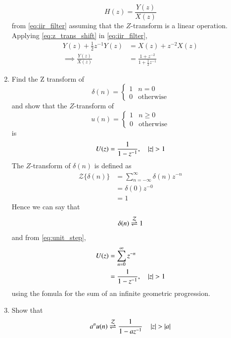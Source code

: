 \documentclass[journal,12pt,twocolumn]{IEEEtran}
\renewcommand\thesection{\arabic{section}}
\begin{document}
\begin{enumerate}[label=\thesection.\arabic*]
	\begin{equation}
		H(z) = \frac{Y(z)}{X(z)}
	\end{equation}
	from  \eqref{eq:iir_filter} assuming that the $Z$-transform is a linear operation.
	\\
	\solution  Applying \eqref{eq:z_trans_shift} in \eqref{eq:iir_filter},
	\begin{align}
		Y(z) + \frac{1}{2}z^{-1}Y(z) &= X(z)+z^{-2}X(z)
		\\
		\implies \frac{Y(z)}{X(z)} &= \frac{1 + z^{-2}}{1 + \frac{1}{2}z^{-1}}
		\label{eq:freq_resp}
	\end{align}
	\item Find the Z transform of 
	\begin{equation}
		\delta(n)
		=
		\begin{cases}
			1 & n = 0
			\\
			0 & \text{otherwise}
		\end{cases}
	\end{equation}
	and show that the $Z$-transform of
	\begin{equation}
		\label{eq:unit_step}
		u(n)
		=
		\begin{cases}
			1 & n \ge 0
			\\
			0 & \text{otherwise}
		\end{cases}
	\end{equation}
	is
	\begin{equation}
		U(z) = \frac{1}{1-z^{-1}}, \quad \left\vert z\right\vert > 1
	\end{equation}
	\solution The $Z$-transform of $\delta(n)$ is defined as
	\begin{align}
		{\mathcal {Z}}\{\delta(n)\}&=\sum _{n=-\infty }^{\infty }\delta(n)z^{-n}\\
		&=\delta(0)z^{-0}\\
		&=1
	\end{align}
	Hence we can say that
	\begin{equation}
		\label{eq:z_trans1}
		\delta(n) \overset{\mathcal{Z}}{ \rightleftharpoons} 1
	\end{equation}
	and from \eqref{eq:unit_step},
	\begin{align}
		U(z) &= \sum _{n= 0}^{\infty}z^{-n}
		\\
		&=\frac{1}{1-z^{-1}}, \quad \left\vert z\right\vert > 1
	\end{align}
	using the fomula for the sum of an infinite geometric progression.
	\item Show that 
	\begin{equation}
		\label{eq:anun}
		a^nu(n) \ztrans \frac{1}{1-az^{-1}} \quad \abs{z} > \abs{a}

\end{equation}
\end{enumerate}
\end{document}
